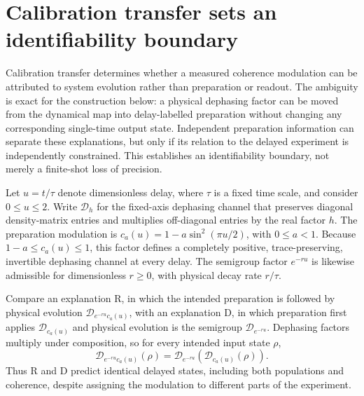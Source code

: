 \documentclass[11pt]{article}
\begin{document}
\section{Calibration transfer sets an identifiability boundary}
Calibration transfer determines whether a measured coherence modulation can be attributed to system evolution rather than preparation or readout. The ambiguity is exact for the construction below: a physical dephasing factor can be moved from the dynamical map into delay-labelled preparation without changing any corresponding single-time output state. Independent preparation information can separate these explanations, but only if its relation to the delayed experiment is independently constrained. This establishes an identifiability boundary, not merely a finite-shot loss of precision.

\begingroup\setlength{\fboxsep}{9pt}
\noindent{}\endgroup\par\medskip
Let $u=t/\tau$ denote dimensionless delay, where $\tau$ is a fixed time scale, and consider $0\leq u\leq2$. Write $\mathcal D_h$ for the fixed-axis dephasing channel that preserves diagonal density-matrix entries and multiplies off-diagonal entries by the real factor $h$. The preparation modulation is $c_a(u)=1-a\sin^2(\pi u/2)$, with $0\leq a<1$. Because $1-a\leq c_a(u)\leq1$, this factor defines a completely positive, trace-preserving, invertible dephasing channel at every delay. The semigroup factor $e^{-ru}$ is likewise admissible for dimensionless $r\geq0$, with physical decay rate $r/\tau$.

Compare an explanation R, in which the intended preparation is followed by physical evolution $\mathcal D_{e^{-ru}c_a(u)}$, with an explanation D, in which preparation first applies $\mathcal D_{c_a(u)}$ and physical evolution is the semigroup $\mathcal D_{e^{-ru}}$. Dephasing factors multiply under composition, so for every intended input state $\rho$,
\[\mathcal D_{e^{-ru}c_a(u)}(\rho)=\mathcal D_{e^{-ru}}\!\left(\mathcal D_{c_a(u)}(\rho)\right).\]
Thus R and D predict identical delayed states, including both populations and coherence, despite assigning the modulation to different parts of the experiment.
\end{document}
